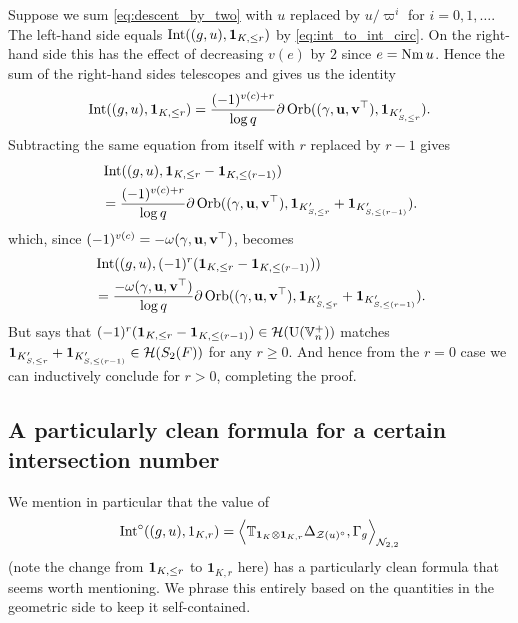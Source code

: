Suppose we sum \eqref{eq:descent_by_two} with $u$ replaced by
$u/\varpi^i$ for $i = 0, 1, \dots$.
The left-hand side equals $\operatorname{Int}((g,u), \mathbf{1}_{K, \le r})$ by \eqref{eq:int_to_int_circ}.
On the right-hand side this has the effect of decreasing $v(e)$ by $2$ since $e = \operatorname{Nm} u$.
Hence the sum of the right-hand sides telescopes and gives us the identity
\begin{equation}
  \operatorname{Int}((g,u), \mathbf{1}_{K, \le r})
  = \frac{(-1)^{v(c)+r}}{\log q}
    \partial\operatorname{Orb}({(\gamma, \mathbf u, \mathbf v^\top)}, \mathbf{1}_{K'_{S, \le r}}).
  \label{eq:match_penultimate}
\end{equation}
Subtracting the same equation from itself with $r$ replaced by $r-1$ gives
\begin{align*}
  &\operatorname{Int}((g,u), \mathbf{1}_{K, \le r} - \mathbf{1}_{K, \le (r-1)}) \\
  &= \frac{(-1)^{v(c)+r}}{\log q}
    \partial \operatorname{Orb}({(\gamma, \mathbf u, \mathbf v^\top)}, \mathbf{1}_{K'_{S, \le r}} + \mathbf{1}_{K'_{S, \le (r-1)}}).
\end{align*}
which, since $(-1)^{v(c)} = -\omega{(\gamma, \mathbf u, \mathbf v^\top)}$, becomes
\begin{equation}
  \begin{aligned}
    &\operatorname{Int}((g,u), (-1)^r(\mathbf{1}_{K, \le r} - \mathbf{1}_{K, \le (r-1)})) \\
    &= \frac{-\omega{(\gamma, \mathbf u, \mathbf v^\top)}}{\log q}
    \partial \operatorname{Orb}({(\gamma, \mathbf u, \mathbf v^\top)}, \mathbf{1}_{K'_{S, \le r}} + \mathbf{1}_{K'_{S, \le (r-1)}}).
  \end{aligned}
  \label{eq:match_final}
\end{equation}
But  says that
$(-1)^r(\mathbf{1}_{K, \le r} - \mathbf{1}_{K, \le (r-1)}) \in \mathcal H(\operatorname{U}(\mathbb V_n^+))$
matches $\mathbf{1}_{K'_{S, \le r}} + \mathbf{1}_{K'_{S, \le (r-1)}} \in \mathcal H(S_2(F))$
for any $r \ge 0$.
And hence from the $r = 0$ case we can inductively conclude
 for $r > 0$, completing the proof.

\subsection{A particularly clean formula for a certain intersection number}
We mention in particular that the value of
\[ \operatorname{Int}^\circ((g,u), 1_{K,r})
  = \Big\langle \mathbb{T}_{\mathbf{1}_K \otimes \mathbf{1}_{K, r}}
    \Delta_{\mathcal Z(u)^\circ}, \Gamma_g \Big\rangle_{\mathcal N_{2,2}} \]
(note the change from $\mathbf{1}_{K, \le r}$ to $\mathbf{1}_{K, r}$ here)
has a particularly clean formula that seems worth mentioning.
We phrase this entirely based on the quantities in the geometric side to keep it self-contained.

